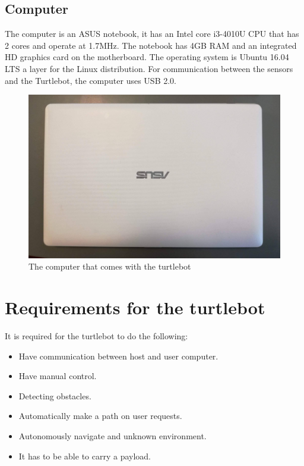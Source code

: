\subsection{Computer} 
The computer is an ASUS notebook, it has an Intel core i3-4010U CPU that has 2 cores and operate at 1.7MHz\cite{CPU}. The notebook has 4GB RAM and an integrated HD graphics card on the motherboard\cite{ASUS}.
The operating system is Ubuntu 16.04 LTS a layer for the Linux distribution. For communication between the sensors and the Turtlebot, the computer uses USB 2.0.
\begin{figure}[h]
   \centering
    \includegraphics[width=.6\textwidth]{figures/ASUS.jpg}
    \caption{The computer that comes with the turtlebot}
    \label{fig:ASUS}
\end{figure}


\section{Requirements for the turtlebot}\label{ch:Requirements for the turtlebot}
It is required for the turtlebot to do the following:
\begin{itemize}
    \item Have communication between host and user computer. 
    \item Have manual control.
    \item Detecting obstacles.
    \item Automatically make a path on user requests.
    \item Autonomously navigate and unknown environment.
    \item It has to be able to carry a payload.
\end{itemize}